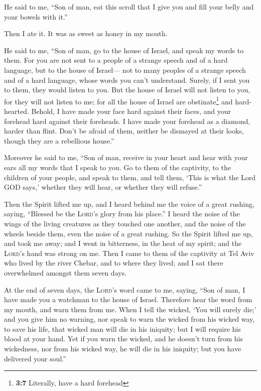  He said to me, ``Son of man, eat this scroll that I give
you and fill your belly and your bowels with it.''

Then I ate it. It was as sweet as honey in my mouth.

 He said to me, ``Son of man, go to the house of Israel,
and speak my words to them.  For you are not sent to a
people of a strange speech and of a hard language, but to the house of
Israel---  not to many peoples of a strange speech and of
a hard language, whose words you can't understand. Surely, if I sent you
to them, they would listen to you.  But the house of
Israel will not listen to you, for they will not listen to me; for all
the house of Israel are obstinate\footnote{\textbf{3:7} Literally, have
  a hard forehead} and hard-hearted.  Behold, I have made
your face hard against their faces, and your forehead hard against their
foreheads.  I have made your forehead as a diamond, harder
than flint. Don't be afraid of them, neither be dismayed at their looks,
though they are a rebellious house.''

 Moreover he said to me, ``Son of man, receive in your
heart and hear with your ears all my words that I speak to you.
 Go to them of the captivity, to the children of your
people, and speak to them, and tell them, `This is what the Lord GOD
says,' whether they will hear, or whether they will refuse.''

 Then the Spirit lifted me up, and I heard behind me the
voice of a great rushing, saying, ``Blessed be the \textsc{Lord}'s glory
from his place.''  I heard the noise of the wings of the
living creatures as they touched one another, and the noise of the
wheels beside them, even the noise of a great rushing. 
So the Spirit lifted me up, and took me away; and I went in bitterness,
in the heat of my spirit; and the \textsc{Lord}'s hand was strong on me.
 Then I came to them of the captivity at Tel Aviv who
lived by the river Chebar, and to where they lived; and I sat there
overwhelmed amongst them seven days.

 At the end of seven days, the \textsc{Lord}'s word came
to me, saying,  ``Son of man, I have made you a watchman
to the house of Israel. Therefore hear the word from my mouth, and warn
them from me.  When I tell the wicked, `You will surely
die;' and you give him no warning, nor speak to warn the wicked from his
wicked way, to save his life, that wicked man will die in his iniquity;
but I will require his blood at your hand.  Yet if you
warn the wicked, and he doesn't turn from his wickedness, nor from his
wicked way, he will die in his iniquity; but you have delivered your
soul.''

